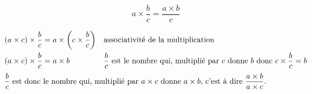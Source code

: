 \begin{changemargin}{0mm}{-15mm}
    \begin{propriete}
        $$a\times\dfrac{b}{c}= \dfrac{a\times b}{c}$$
    \end{propriete}
    
    \begin{preuve}
        \begin{align*}
            (a\times c)\times\dfrac{b}{c} &=a\times \left(c\times\dfrac{b}{c}\right) && \text{associativité de la multiplication}\\
            (a\times c)\times\dfrac{b}{c} &=a\times b&& \text{$\dfrac{b}{c}$ est le nombre qui, multiplié par $c$ donne $b$ donc $c\times\dfrac{b}{c} =b$}\\        
            \intertext{\centering $\dfrac{b}{c}$ est donc le nombre qui, multiplié par $a\times c$ donne $a\times b$, c'est à dire $\dfrac{a\times b}{a\times c}$.}
        \end{align*}                
    \end{preuve}
\end{changemargin}
 
